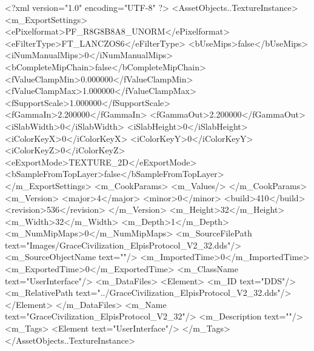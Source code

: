 <?xml version="1.0" encoding="UTF-8" ?>
<AssetObjects..TextureInstance>
	<m_ExportSettings>
		<ePixelformat>PF_R8G8B8A8_UNORM</ePixelformat>
		<eFilterType>FT_LANCZOS6</eFilterType>
		<bUseMips>false</bUseMips>
		<iNumManualMips>0</iNumManualMips>
		<bCompleteMipChain>false</bCompleteMipChain>
		<fValueClampMin>0.000000</fValueClampMin>
		<fValueClampMax>1.000000</fValueClampMax>
		<fSupportScale>1.000000</fSupportScale>
		<fGammaIn>2.200000</fGammaIn>
		<fGammaOut>2.200000</fGammaOut>
		<iSlabWidth>0</iSlabWidth>
		<iSlabHeight>0</iSlabHeight>
		<iColorKeyX>0</iColorKeyX>
		<iColorKeyY>0</iColorKeyY>
		<iColorKeyZ>0</iColorKeyZ>
		<eExportMode>TEXTURE_2D</eExportMode>
		<bSampleFromTopLayer>false</bSampleFromTopLayer>
	</m_ExportSettings>
	<m_CookParams>
		<m_Values/>
	</m_CookParams>
	<m_Version>
		<major>4</major>
		<minor>0</minor>
		<build>410</build>
		<revision>536</revision>
	</m_Version>
	<m_Height>32</m_Height>
	<m_Width>32</m_Width>
	<m_Depth>1</m_Depth>
	<m_NumMipMaps>0</m_NumMipMaps>
	<m_SourceFilePath text="Images/GraceCivilization_ElpisProtocol_V2_32.dds"/>
	<m_SourceObjectName text=""/>
	<m_ImportedTime>0</m_ImportedTime>
	<m_ExportedTime>0</m_ExportedTime>
	<m_ClassName text="UserInterface"/>
	<m_DataFiles>
		<Element>
			<m_ID text="DDS"/>
			<m_RelativePath text="../GraceCivilization_ElpisProtocol_V2_32.dds"/>
		</Element>
	</m_DataFiles>
	<m_Name text="GraceCivilization_ElpisProtocol_V2_32"/>
	<m_Description text=""/>
	<m_Tags>
		<Element text="UserInterface"/>
	</m_Tags>
</AssetObjects..TextureInstance>
